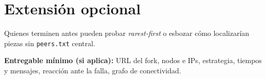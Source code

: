 \documentclass[12pt,a4paper]{article}
\begin{document}
\section{Extensión opcional}

Quienes terminen antes pueden probar \emph{rarest-first} o esbozar cómo localizarían piezas sin \texttt{peers.txt} central.

\vspace{0.5cm}
\noindent\textbf{Entregable mínimo (si aplica):} URL del fork, nodos e IPs, estrategia, tiempos y mensajes, reacción ante la falla, grafo de conectividad.
\end{document}

